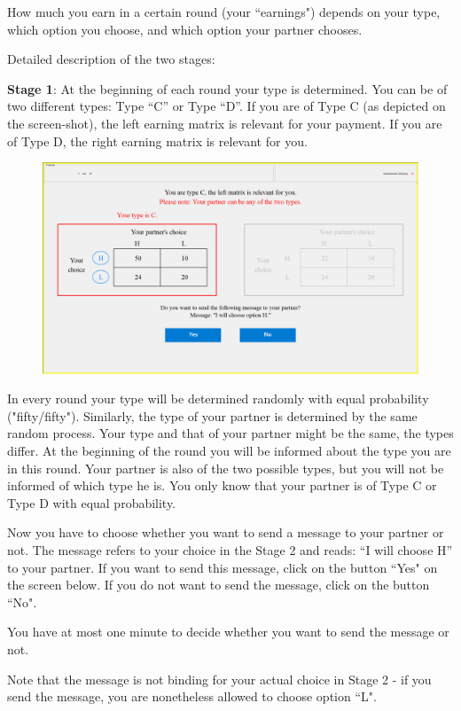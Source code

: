 \documentclass[12pt]{article}
\theoremstyle{break}
\begin{document}
How much you earn in a certain round (your ``earnings") depends on your type, which option you choose, and which option your partner chooses. 

Detailed description of the two stages: 

\textbf{Stage 1}: At the beginning of each round your type is determined. You can be of two different types: Type “C” or Type “D”. If you are of Type C (as depicted on the screen-shot), the left earning matrix is relevant for your payment. If you are of Type D, the right earning matrix is relevant for you. 

\begin{figure}[h]
  \centering
    \includegraphics[width=.9\textwidth]{fig1-CT-instructions.png}
  \label{fig:fig1-CT-instructions}
\end{figure}


In every round your type will be determined randomly with equal probability ("fifty/fifty"). Similarly, the type of your partner is determined by the same random process. Your type and that of your partner might be the same, the types differ.
At the beginning of the round you will be informed about the type you are in this round. Your partner is also of the two possible types, but you will not be informed of which type he is. You only know that your partner is of Type C or Type D with equal probability.

Now you have to choose whether you want to send a message to your partner or not. The message refers to your choice in the Stage 2 and reads: “I will choose H” to your partner. If you want to send this message, click on the button ``Yes" on the screen below. If you do not want to send the message, click on the button ``No". 

You have at most one minute to decide whether you want to send the message or not. 

Note that the message is not binding for your actual choice in Stage 2 - if you send the message, you are nonetheless allowed to choose option ``L".
\end{document}
